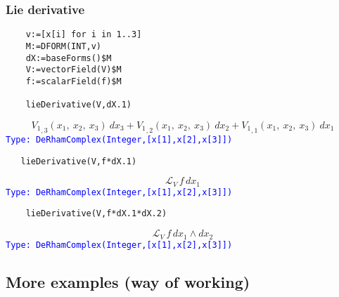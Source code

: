 \documentclass[12pt,a4paper]{article}
\newcommand{\type}[1]{\textcolor{blue}{\tt\tiny #1}}
\begin{document}
\subsubsection{Lie derivative}
\begin{lstlisting}
    v:=[x[i] for i in 1..3]
    M:=DFORM(INT,v)
    dX:=baseForms()$M
    V:=vectorField(V)$M
    f:=scalarField(f)$M
    
    lieDerivative(V,dX.1)
\end{lstlisting}
\begin{displaymath}
    {V _ {1}} _ {{,3}}
    \left(
    x _ {1}, \: {x _ {2}}, \: {x _ {3}}
    \right)
    \  {dx _ {3}}+{{V _ {1}} _ {{,2}}}
    \left(
    {{x _ {1}}, \: {x _ {2}}, \: {x _ {3}}}
    \right)
    \  {dx _ {2}}+{V _ {1}} _ {{,1}} 
    \left(
    {{x _ {1}}, \: {x _ {2}}, \: {x _ {3}}}
    \right)
    \  dx _ {1}
\end{displaymath}
\type{Type: DeRhamComplex(Integer,[x[1],x[2],x[3]])}
\begin{lstlisting}
   lieDerivative(V,f*dX.1)
\end{lstlisting}
\begin{displaymath}
   {\mathcal L}_V\,f\,dx_1
\end{displaymath}
\type{Type: DeRhamComplex(Integer,[x[1],x[2],x[3]])}
\begin{lstlisting}
    lieDerivative(V,f*dX.1*dX.2)
\end{lstlisting}
\begin{displaymath}
   {\mathcal L}_V\,f\,dx_1\wedge dx_2
\end{displaymath}
\type{Type: DeRhamComplex(Integer,[x[1],x[2],x[3]])}
%
\subsection{More examples (way of working)}
\end{document}
